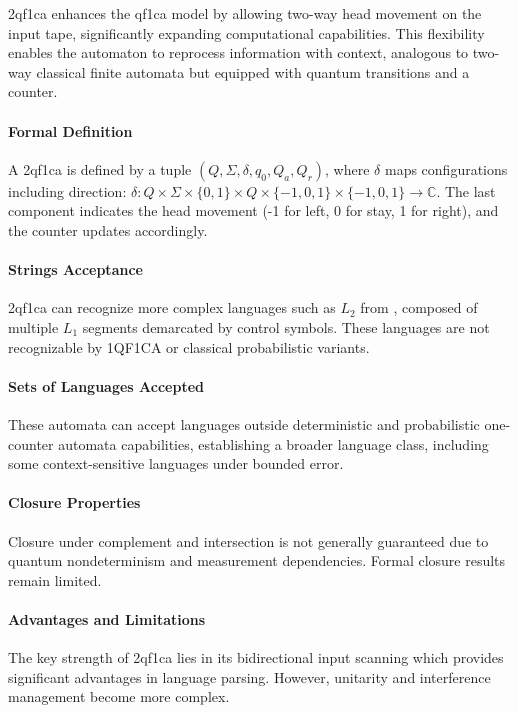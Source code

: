\gls{2qf1ca} enhances the \gls{qf1ca} model by allowing two-way head movement on the input tape, significantly expanding computational capabilities. This flexibility enables the automaton to reprocess information with context, analogous to two-way classical finite automata but equipped with quantum transitions and a counter.

\paragraph{Formal Definition}
A \gls{2qf1ca} is defined by a tuple $(Q, \Sigma, \delta, q_0, Q_a, Q_r)$, where $\delta$ maps configurations including direction: $\delta: Q \times \Sigma \times \{0,1\} \times Q \times \{-1,0,1\} \times \{-1,0,1\} \rightarrow \mathbb{C}$. The last component indicates the head movement (-1 for left, 0 for stay, 1 for right), and the counter updates accordingly.

\paragraph{Strings Acceptance}
\gls{2qf1ca} can recognize more complex languages such as $L_2$ from \cite{bonner2001quantum}, composed of multiple $L_1$ segments demarcated by control symbols. These languages are not recognizable by 1QF1CA or classical probabilistic variants.

\paragraph{Sets of Languages Accepted}
These automata can accept languages outside deterministic and probabilistic one-counter automata capabilities, establishing a broader language class, including some context-sensitive languages under bounded error.

\paragraph{Closure Properties}
Closure under complement and intersection is not generally guaranteed due to quantum nondeterminism and measurement dependencies. Formal closure results remain limited.

\paragraph{Advantages and Limitations}
The key strength of \gls{2qf1ca} lies in its bidirectional input scanning which provides significant advantages in language parsing. However, unitarity and interference management become more complex.

